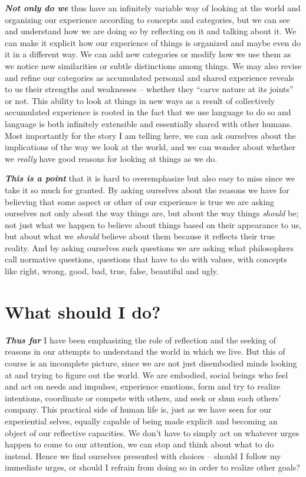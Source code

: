 \documentclass[]{book}
\begin{document}
\textbf{\emph{Not only do we}} thus have an infinitely variable way of looking at the world and organizing our experience according to concepts and categories, but we can see and understand how we are doing so by reflecting on it and talking about it. We can make it explicit how our experience of things is organized and maybe even do it in a different way. We can add new categories or modify how we use them as we notice new similarities or subtle distinctions among things. We may also revise and refine our categories as accumulated personal and shared experience reveals to us their strengths and weaknesses -- whether they ``carve nature at its joints'' or not. This ability to look at things in new ways as a result of collectively accumulated experience is rooted in the fact that we use language to do so and language is both infinitely extensible and essentially shared with other humans. Most importantly for the story I am telling here, we can ask ourselves about the implications of the way we look at the world, and we can wonder about whether we \emph{really} have good reasons for looking at things as we do.

\textbf{\emph{This is a point}} that it is hard to overemphasize but also easy to miss since we take it so much for granted. By asking ourselves about the reasons we have for believing that some aspect or other of our experience is true we are asking ourselves not only about the way things are, but about the way things \emph{should} be; not just what we happen to believe about things based on their appearance to us, but about what we \emph{should} believe about them because it reflects their true reality. And by asking ourselves such questions we are asking what philosophers call normative questions, questions that have to do with values, with concepts like right, wrong, good, bad, true, false, beautiful and ugly.

\hypertarget{what-should-i-do}{%
\section{What should I do?}\label{what-should-i-do}}

\textbf{\emph{Thus far}} I have been emphasizing the role of reflection and the seeking of reasons in our attempts to understand the world in which we live. But this of course is an incomplete picture, since we are not just disembodied minds looking at and trying to figure out the world. We are embodied, social beings who feel and act on needs and impulses, experience emotions, form and try to realize intentions, coordinate or compete with others, and seek or shun each others' company. This practical side of human life is, just as we have seen for our experiential selves, equally capable of being made explicit and becoming an object of our reflective capacities. We don't have to simply act on whatever urges happen to come to our attention, we can stop and think about what to do instead. Hence we find ourselves presented with choices -- should I follow my immediate urges, or should I refrain from doing so in order to realize other goals?
\end{document}
